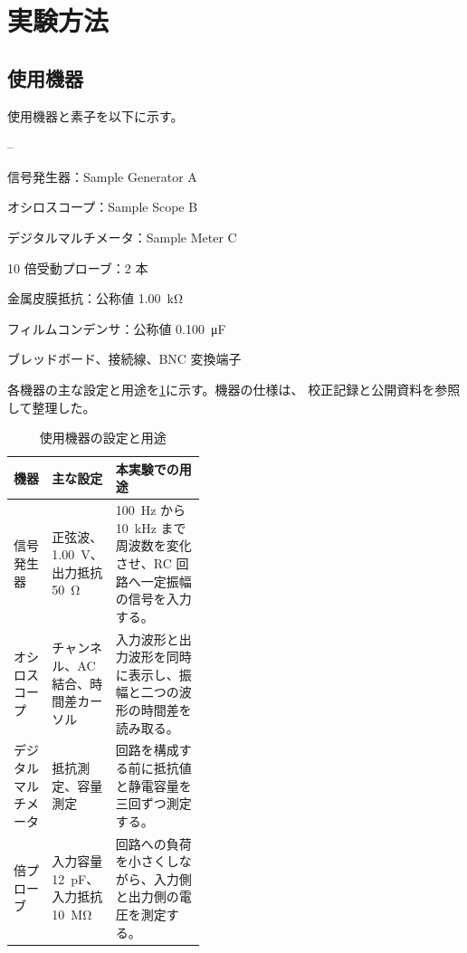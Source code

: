\section{実験方法}
\label{sec:method}

\subsection{使用機器}
\label{subsec:equipment}

使用機器と素子を以下に示す。
\begin{list}{--}{%
  \setlength{\leftmargin}{2.8em}%
  \setlength{\itemsep}{0.15em}%
  \setlength{\parsep}{0pt}%
}
  \item 信号発生器：Sample Generator A
  \item オシロスコープ：Sample Scope B
  \item デジタルマルチメータ：Sample Meter C
  \item 10 倍受動プローブ：2 本
  \item 金属皮膜抵抗：公称値 \qty{1.00}{\kilo\ohm}
  \item フィルムコンデンサ：公称値 \qty{0.100}{\micro\farad}
  \item ブレッドボード、接続線、BNC 変換端子
\end{list}


各機器の主な設定と用途を\cref{tab:equipment}に示す。機器の仕様は、
校正記録と公開資料を参照して整理した\cite{jp-report,jp-online,jp-misc}。

\begin{table}[htbp]
  \centering
  \caption{使用機器の設定と用途}
  \label{tab:equipment}
  \begin{tabularx}{\linewidth}{
      >{\raggedright\arraybackslash}p{0.20\linewidth}
      >{\raggedright\arraybackslash}p{0.22\linewidth}
      >{\raggedright\arraybackslash}X}
    \toprule
    機器 & 主な設定 & 本実験での用途 \\
    \midrule
    信号発生器
      & 正弦波、\qty{1.00}{\volt}、出力抵抗 \qty{50}{\ohm}
      & \qty{100}{\hertz} から \qty{10}{\kilo\hertz} まで周波数を変化させ、RC 回路へ一定振幅の信号を入力する。\\
    オシロスコープ
      & 2 チャンネル、AC 結合、時間差カーソル
      & 入力波形と出力波形を同時に表示し、振幅と二つの波形の時間差を読み取る。\\
    デジタルマルチメータ
      & 抵抗測定、容量測定
      & 回路を構成する前に抵抗値と静電容量を三回ずつ測定する。\\
    10 倍プローブ
      & 入力容量 \qty{12}{\pico\farad}、入力抵抗 \qty{10}{\mega\ohm}
      & 回路への負荷を小さくしながら、入力側と出力側の電圧を測定する。\\
    \bottomrule
  \end{tabularx}
\end{table}

